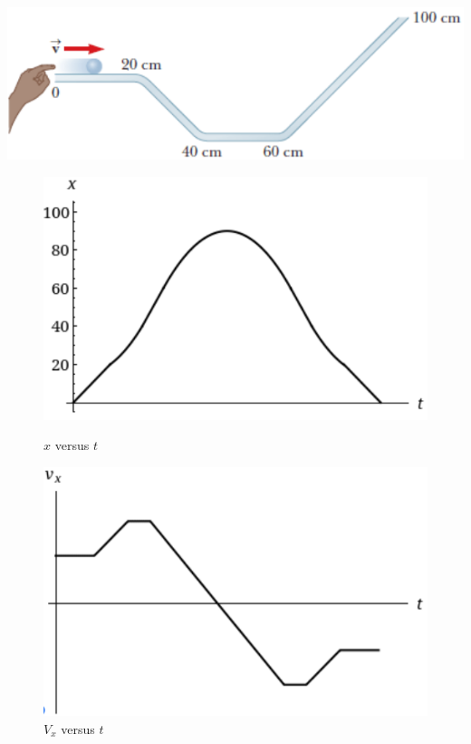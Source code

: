 \documentclass[
  letterpaper,
  DIV=11,
  numbers=noendperiod]{scrartcl}
\begin{document}
\includegraphics{img/Acceleration Definitions HW/problem1.png}

\newpage{}

\begin{figure}[!htb]
   \begin{minipage}{0.48\textwidth}
     \centering
     \includegraphics[width=\linewidth]{img/Acceleration Definitions HW/xversust.png}
     \caption*{$x$ versus $t$}
   \end{minipage}\hfill
   \begin{minipage}{0.48\textwidth}
     \centering
     \includegraphics[width=\linewidth]{img/Acceleration Definitions HW/vxversust.png}
     \caption*{$V_x$ versus $t$}
   \end{minipage}
\end{figure}
\end{document}
